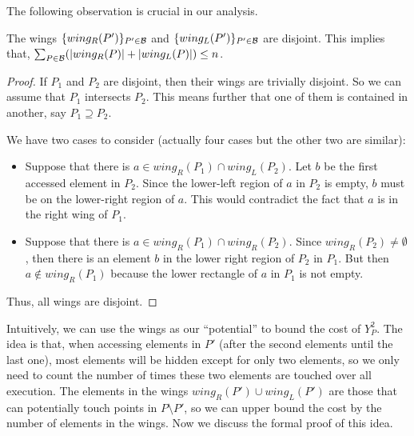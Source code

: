 The following observation is crucial in our analysis. 

\begin{observation} 
The wings $\{wing_R(P')\}_{P' \in {\mathcal{B}}}$ and $\{wing_L(P')\}_{P' \in {\mathcal{B}}}$ are disjoint.   
This implies that, $\sum_{P \in {\mathcal{B}}} (|wing_{R}(P)|+|wing_{L}(P)|) \le n$.
\end{observation}
 
\begin{proof} 
If $P_{1}$ and $P_{2}$ are disjoint, then their wings are trivially
disjoint. 
So we can assume that $P_{1}$ intersects $P_{2}$. 
This means further that one of them is contained in another, say $P_{1}\supseteq P_{2}$. 

We have two cases to consider (actually four cases but the other two are similar): 
\begin{itemize} 
\item Suppose that there is $a\in wing_{R}(P_{1})\cap wing_{L}(P_{2})$.
Let $b$ be the first accessed element in $P_{2}$. 
Since the lower-left region of $a$ in $P_2$ is empty, $b$ must be on the lower-right region of $a$.  
This would contradict the fact that $a$ is in the right wing of $P_1$. 

\item Suppose that there is $a\in wing_{R}(P_{1})\cap wing_{R}(P_{2})$. 
Since $wing_{R}(P_{2})\neq\emptyset$, then
there is an element $b$ in the lower right region of $P_{2}$
in $P_{1}$. 
But then $a\notin wing_{R}(P_{1})$ because the lower
rectangle of $a$ in $P_{1}$ is not empty.
\end{itemize} 
Thus, all wings are disjoint. 
\end{proof} 


Intuitively, we can use the wings as our ``potential'' to bound the cost of $Y_P^2$.
The idea is that, when accessing elements in $P'$ (after the second elements until the last one), most elements will be hidden except for only two elements, so we only need to count the number of times these two elements are touched over all execution.  
The elements in the wings $wing_R(P') \cup wing_L(P')$ are those that can potentially touch points in $P \setminus P'$, so we can upper bound the cost by the number of elements in the wings.  
Now we discuss the formal proof of this idea. 

